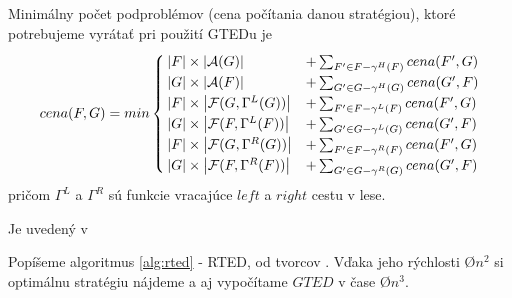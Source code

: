 \begin{lemma}
  Minimálny počet podproblémov (cena počítania danou stratégiou),
  ktoré potrebujeme vyrátať pri použití GTEDu je
  \begin{align*}
    cena(F, G) = min
    \begin{cases}
      \left|{F}\right| \times \left|{\mathcal{A}(G)}\right| &+ \sum_{{F}' \in F - \gamma^{H}(F)}cena({F}', G)
      \\
      \left|{G}\right| \times \left|{\mathcal{A}(F)}\right| &+ \sum_{{G}' \in G - \gamma^{H}(G)}cena({G}', F)
      \\
      \left|{F}\right| \times \left|{\mathcal{F}(G, \Gamma^{L}(G))}\right| &+ \sum_{{F}' \in F - \gamma^{L}(F)}cena({F}', G)
      \\
      \left|{G}\right| \times \left|{\mathcal{F}(F, \Gamma^{L}(F))}\right| &+ \sum_{{G}' \in G - \gamma^{L}(G)}cena({G}', F)
      \\
      \left|{F}\right| \times \left|{\mathcal{F}(G, \Gamma^{R}(G))}\right| &+ \sum_{{F}' \in F - \gamma^{R}(F)}cena({F}', G)
      \\
      \left|{G}\right| \times \left|{\mathcal{F}(F, \Gamma^{R}(F))}\right| &+ \sum_{{G}' \in G - \gamma^{R}(G)}cena({G}', F)
    \end{cases}
  \end{align*}
  pričom $\Gamma^{L}$ a $\Gamma^{R}$ sú funkcie vracajúce $left$ a $right$ cestu v lese.
\end{lemma}

\begin{dukaz}
  Je uvedený v 
\end{dukaz}

Popíšeme algoritmus \ref{alg:rted} - RTED, od tvorcov \citet{RTED}.
Vďaka jeho rýchlosti \O{$n^2$} si optimálnu stratégiu nájdeme a aj vypočítame
$GTED$ v čase \O{$n^3$}.

